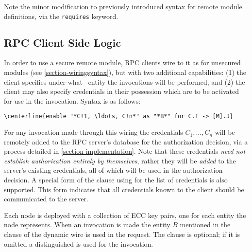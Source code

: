 Note the minor modification to previously introduced syntax for remote module definitions, via
the \texttt{requires} keyword.

\subsection{RPC Client Side Logic}
\label{section-rpc-client-side}

In order to use a secure remote module, RPC clients wire to it as for unsecured modules (see
\autoref{section-wiringsyntax}), but with two additional capabilities: (1) the client specifies
under what \RT\ entity the invocations will be performed, and (2) the client may also specify
credentials in their possession which are to be activated for use in the invocation. Syntax is
as follows:
\begin{Verbatim}[commandchars=\\\{\}, codes={\catcode`*=3\catcode`!=8}]
\centerline{enable "*C!1, \ldots, C!n*" as "*B*" for C.I -> [M].J}
\end{Verbatim}
For any invocation made through this wiring the credentials $C_1, \ldots, C_n$ will be remotely
added to the RPC server's database for the authorization decision, via a process detailed in
\autoref{section-implementation}. Note that these credentials \emph{need not establish
  authorization entirely by themselves}, rather they will be \emph{added} to the server's
existing credentials, all of which will be used in the authorization decision. A special form of
the  clause using  for the list of credentials is also supported. This
form indicates that all credentials known to the client should be communicated to the server.

Each node is deployed with a collection of ECC key pairs, one for each entity the node
represents. When an invocation is made the entity $B$ mentioned in the  clause of the
dynamic wire is used in the request. The  clause is optional; if it is omitted a
distinguished  is used for the invocation.

